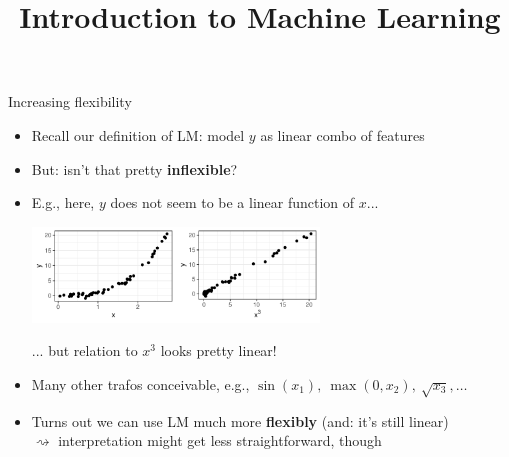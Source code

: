 \documentclass[11pt,compress,t,notes=noshow, xcolor=table]{beamer}
\title{Introduction to Machine Learning}
\begin{document}



\begin{vbframe}{Increasing flexibility}

\begin{itemize}
    \item Recall our definition of LM: model $y$ as linear combo of features
    \item But: isn't that pretty \textbf{inflexible}?
    \item E.g., here, $y$ does not seem to be a linear function of $x$...

    \vspace{0.5cm}
    \begin{center}
        \includegraphics[width=0.6\textwidth]{figure/reg_poly_yx3.pdf}
    \end{center}

    ... but relation to $x^3$ looks pretty linear!

    \item Many other trafos conceivable, e.g.,
    $\sin(x_1), ~ \max(0, x_2), ~ \sqrt{x_3}, \dots$
    \item Turns out we can use LM much more
    \textbf{flexibly} (and: it's still linear) \\
    $\rightsquigarrow$ interpretation might get less straightforward, though
\end{itemize}

\end{vbframe}

\end{document}
